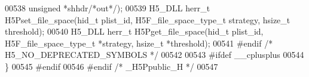 \begin{DoxyCode}
00538          \textcolor{keywordtype}{unsigned} *shhdr\textcolor{comment}{/*out*/});
00539 H5\_DLL herr\_t H5Pset\_file\_space(hid\_t plist\_id, H5F\_file\_space\_type\_t strategy, hsize\_t threshold);
00540 H5\_DLL herr\_t H5Pget\_file\_space(hid\_t plist\_id, H5F\_file\_space\_type\_t *strategy, hsize\_t *threshold);
00541 \textcolor{preprocessor}{#endif }\textcolor{comment}{/* H5\_NO\_DEPRECATED\_SYMBOLS */}\textcolor{preprocessor}{}
00542 
00543 \textcolor{preprocessor}{#ifdef \_\_cplusplus}
00544 \}
00545 \textcolor{preprocessor}{#endif}
00546 \textcolor{preprocessor}{#endif }\textcolor{comment}{/* \_H5Ppublic\_H */}\textcolor{preprocessor}{}
00547 
\end{DoxyCode}
